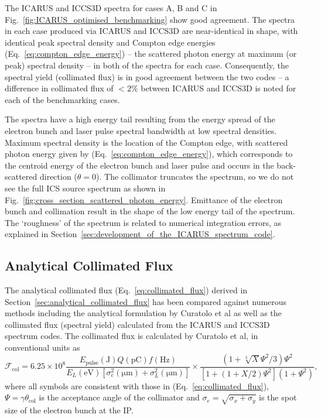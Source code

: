 \documentclass[../main.tex]{subfiles}
\begin{document}
The \textsc{ICARUS} and \textsc{ICCS3D} spectra for cases A, B and C in Fig.~\ref{fig:ICARUS_optimised_benchmarking} show good agreement. The spectra in each case produced via \textsc{ICARUS} and \textsc{ICCS3D} are near-identical in shape, with identical peak spectral density and Compton edge energies (Eq.~\ref{eq:compton_edge_energy}) -- the scattered photon energy at maximum (or peak) spectral density -- in both of the spectra for each case. Consequently, the spectral yield (collimated flux) is in good agreement between the two codes -- a difference in collimated flux of $< 2\%$ between \textsc{ICARUS} and \textsc{ICCS3D} is noted for each of the benchmarking cases.

The spectra have a high energy tail resulting from the energy spread of the electron bunch and laser pulse spectral bandwidth at low spectral densities. Maximum spectral density is the location of the Compton edge, with scattered photon energy given by (Eq.~\ref{eq:compton_edge_energy}), which corresponds to the centroid energy of the electron bunch and laser pulse and occurs in the back-scattered direction ($\theta=0$). The collimator truncates the spectrum, so we do not see the full ICS source spectrum as shown in Fig.~\ref{fig:cross_section_scattered_photon_energy}. Emittance of the electron bunch and collimation result in the shape of the low energy tail of the spectrum. The `roughness' of the spectrum is related to numerical integration errors, as explained in Section~\ref{sec:development_of_the_ICARUS_spectrum_code}.

\subsection{Analytical Collimated Flux}
\label{sec:analytical_collimated_flux_benchmarking}

The analytical collimated flux (Eq.~\ref{eq:collimated_flux}) derived in Section~\ref{sec:analytical_collimated_flux} has been compared against numerous methods including the analytical formulation by Curatolo et al \cite{curatolo2017analytical} as well as the collimated flux (spectral yield) calculated from the \textsc{ICARUS} and \textsc{ICCS3D} \cite{krafft2016laser,ranjan2018simulation} spectrum codes. The collimated flux is calculated by Curatolo et al, in conventional units as 
\begin{equation}
\mathcal{F}_{\mathrm{col}} = 6.25\times 10^{8}\frac{E_{\mathrm{pulse}}\left(\mathrm{\si{\joule}}\right)Q\left(\si{\pico\coulomb}\right)f\left(\si{\hertz}\right)}{E_{L}\left(\si{\electronvolt}\right)\left[\sigma_{e}^{2}\left(\si{\micro\meter}\right)+\sigma_{L}^{2}\left(\si{\micro\meter}\right)\right]}\times\frac{\left(1+\sqrt[3]{X}\Psi^{2}/3\right)\Psi^{2}}{\left[1+\left(1+X/2\right)\Psi^{2}\right]\left(1+\Psi^{2}\right)},
\label{eq:curatolo_collimated_flux}
\end{equation}
where all symbols are consistent with those in (Eq.~\ref{eq:collimated_flux}), $\Psi=\gamma\theta_{\mathrm{col}}$ is the acceptance angle of the collimator and $\sigma_{e}=\sqrt{\sigma_{x}+\sigma_{y}}$ is the  spot size of the electron bunch at the IP.
\end{document}

